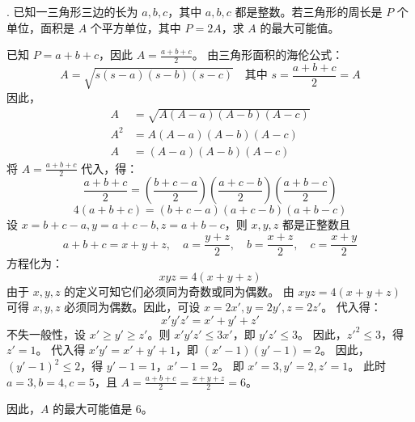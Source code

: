 \begin{questions}
. 已知一三角形三边的长为 $a, b, c$，其中 $a, b, c$ 都是整数。若三角形的周长是 $P$ 个单位，面积是 $A$ 个平方单位，其中 $P = 2A$，求 $A$ 的最大可能值。

\begin{solution}
已知 $P = a+b+c$，因此 $A = \frac{a+b+c}{2}$。
由三角形面积的海伦公式：
\[
A = \sqrt{s(s-a)(s-b)(s-c)} \quad \text{其中 } s = \frac{a+b+c}{2} = A
\]
因此，
\begin{align*}
A &= \sqrt{A(A-a)(A-b)(A-c)} \\
A^2 &= A(A-a)(A-b)(A-c) \\
A &= (A-a)(A-b)(A-c)
\end{align*}
将 $A = \frac{a+b+c}{2}$ 代入，得：
\[
\frac{a+b+c}{2} = \left( \frac{b+c-a}{2} \right) \left( \frac{a+c-b}{2} \right) \left( \frac{a+b-c}{2} \right)
\]
\[
4(a+b+c) = (b+c-a)(a+c-b)(a+b-c)
\]
设 $x = b+c-a, y = a+c-b, z = a+b-c$，则 $x, y, z$ 都是正整数且
\[
a+b+c = x+y+z, \quad a = \frac{y+z}{2}, \quad b = \frac{x+z}{2}, \quad c = \frac{x+y}{2}
\]
方程化为：
\[
xyz = 4(x+y+z)
\]
由于 $x, y, z$ 的定义可知它们必须同为奇数或同为偶数。
由 $xyz = 4(x+y+z)$ 可得 $x, y, z$ 必须同为偶数。因此，可设 $x=2x', y=2y', z=2z'$。
代入得：
\[
x'y'z' = x'+y'+z'
\]
不失一般性，设 $x' \ge y' \ge z'$。则 $x'y'z' \le 3x'$，即 $y'z' \le 3$。
因此，$z'^2 \le 3$，得 $z'=1$。
代入得 $x'y' = x'+y'+1$，即 $(x'-1)(y'-1) = 2$。
因此，$(y'-1)^2 \le 2$，得 $y'-1=1$，$x'-1=2$。
即 $x'=3, y'=2, z'=1$。
此时 $a=3, b=4, c=5$，且 $A = \frac{a+b+c}{2} = \frac{x+y+z}{2} = 6$。

因此，$A$ 的最大可能值是 $6$。
\end{solution}


\end{questions}
